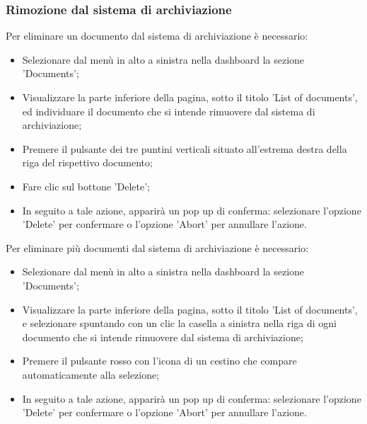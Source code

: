 \documentclass[10pt, a4paper]{article}
\begin{document}
\subsubsection{Rimozione dal sistema di archiviazione}
Per eliminare un documento dal sistema di archiviazione è necessario:
\begin{itemize}
    \item Selezionare dal menù in alto a sinistra nella dashboard la sezione 'Documents';
    \item Visualizzare la parte inferiore della pagina, sotto il titolo 'List of documents', ed individuare il documento che si intende rimuovere dal sistema di archiviazione;
    \item Premere il pulsante dei tre puntini verticali situato all'estrema destra della riga del rispettivo documento;
    \item Fare clic sul bottone 'Delete';
    \item In seguito a tale azione, apparirà un pop up di conferma: selezionare l'opzione 'Delete' per confermare o l'opzione 'Abort' per annullare l'azione.
\end{itemize}
Per eliminare più documenti dal sistema di archiviazione è necessario:
\begin{itemize}
    \item Selezionare dal menù in alto a sinistra nella dashboard la sezione 'Documents';
    \item Visualizzare la parte inferiore della pagina, sotto il titolo 'List of documents', e selezionare spuntando con un clic la casella a sinistra nella riga di ogni documento che si intende rimuovere dal sistema di archiviazione;
    \item Premere il pulsante rosso con l'icona di un cestino che compare automaticamente alla selezione;
    \item In seguito a tale azione, apparirà un pop up di conferma: selezionare l'opzione 'Delete' per confermare o l'opzione 'Abort' per annullare l'azione.
\end{itemize}
\end{document}
